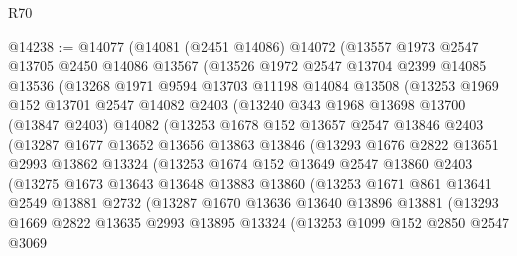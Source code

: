 \begin{lexlean}{R70}
\begin{coremodule}
@14238 := @14077
    (@14081
      (@2451 @14086)
      @14072
      (@13557
        @1973
        @2547
        @13705
        @2450
        @14086
        @13567
        (@13526
          @1972
          @2547
          @13704
          @2399
          @14085
          @13536
          (@13268
            @1971
            @9594
            @13703
            @11198
            @14084
            @13508
            (@13253
              @1969
              @152
              @13701
              @2547
              @14082
              @2403
              (@13240
                @343
                @1968
                @13698
                @13700
                (@13847 @2403)
                @14082
                (@13253
                  @1678
                  @152
                  @13657
                  @2547
                  @13846
                  @2403
                  (@13287
                    @1677
                    @13652
                    @13656
                    @13863
                    @13846
                    (@13293
                      @1676
                      @2822
                      @13651
                      @2993
                      @13862
                      @13324
                      (@13253
                        @1674
                        @152
                        @13649
                        @2547
                        @13860
                        @2403
                        (@13275
                          @1673
                          @13643
                          @13648
                          @13883
                          @13860
                          (@13253
                            @1671
                            @861
                            @13641
                            @2549
                            @13881
                            @2732
                            (@13287
                              @1670
                              @13636
                              @13640
                              @13896
                              @13881
                              (@13293
                                @1669
                                @2822
                                @13635
                                @2993
                                @13895
                                @13324
                                (@13253
                                  @1099
                                  @152
                                  @2850
                                  @2547
                                  @3069

\end{coremodule}
\end{lexlean}
